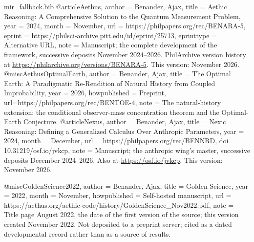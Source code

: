 \begin{filecontents}[overwrite]{mir_fallback.bib}
@article{Aethus,
  author      = {Benander, Ajax},
  title       = {Aethic Reasoning: A Comprehensive Solution to the Quantum Measurement Problem},
  year        = {2024},
  month       = {November},
  url         = {https://philpapers.org/rec/BENARA-5},
  eprint      = {https://philsci-archive.pitt.edu/id/eprint/25713},
  eprinttype  = {Alternative URL},
  note        = {Manuscript; the complete development of the framework, successive
                 deposits November 2024--2026. PhilArchive version history at
                 \url{https://philarchive.org/versions/BENARA-5}. This version: November 2026.}
}
@misc{AethusOptimalEarth,
  author       = {Benander, Ajax},
  title        = {The Optimal Earth: A Paradigmatic Re-Rendition of Natural History from Coupled Improbability},
  year         = {2026},
  howpublished = {Preprint},
  url={https://philpapers.org/rec/BENTOE-4},
  note         = {The natural-history extension; the conditional observer-mass
                  concentration theorem and the Optimal-Earth Conjecture.}
}
@article{Nexus,
  author      = {Benander, Ajax},
  title       = {Nexic Reasoning: Defining a Generalized Calculus Over Anthropic Parameters},
  year        = {2024},
  month       = {December},
  url         = {https://philpapers.org/rec/BENNRD},
  doi         = {10.31219/osf.io/jvkcp},
  note        = {Manuscript; the anthropic wing's master, successive deposits
                 December 2024--2026. Also at \url{https://osf.io/jvkcp}.
                 This version: November 2026.}
}

@misc{GoldenScience2022,
  author       = {Benander, Ajax},
  title        = {Golden Science},
  year         = {2022},
  month        = {November},
  howpublished = {Self-hosted manuscript},
  url          = {https://aethus.org/aethic-code/history/GoldenScience_Nov2022.pdf},
  note         = {Title page August 2022, the date of the first version of the source; this version created November 2022. Not deposited to a
                  preprint server; cited as a dated developmental record rather than
                  as a source of results.}
}
\end{filecontents}
